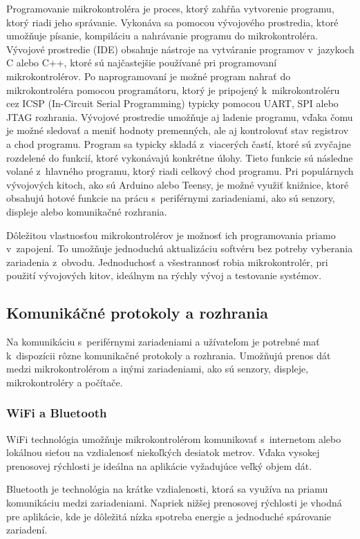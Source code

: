 Programovanie mikrokontroléra je proces, ktorý zahŕňa vytvorenie programu, ktorý riadi jeho správanie.
Vykonáva sa pomocou vývojového prostredia, ktoré umožňuje písanie, kompiláciu a nahrávanie programu do mikrokontroléra.
Vývojové prostredie (IDE) obsahuje nástroje na vytváranie programov v~jazykoch C alebo C++, ktoré sú najčastejšie používané pri programovaní mikrokontrolérov.
Po naprogramovaní je možné program nahrať do mikrokontroléra pomocou programátoru, ktorý je pripojený k~mikrokontroléru cez ICSP (In-Circuit Serial Programming) typicky pomocou UART, SPI alebo JTAG rozhrania.
Vývojové prostredie umožňuje aj ladenie programu, vďaka čomu je možné sledovať a meniť hodnoty premenných, ale aj kontrolovať stav registrov a chod programu.
Program sa typicky skladá z~viacerých častí, ktoré sú zvyčajne rozdelené do funkcií, ktoré vykonávajú konkrétne úlohy.
Tieto funkcie sú následne volané z~hlavného programu, ktorý riadi celkový chod programu.
Pri populárnych vývojových kitoch, ako sú Arduino alebo Teensy, je možné využiť knižnice, ktoré obsahujú hotové funkcie na prácu s~periférnymi zariadeniami, ako sú senzory, displeje alebo komunikačné rozhrania.

Dôležitou vlastnosťou mikrokontrolérov je možnosť ich programovania priamo v~zapojení.
To umožňuje jednoduchú aktualizáciu softvéru bez potreby vyberania zariadenia z~obvodu.
Jednoduchosť a všestrannosť robia mikrokontrolér, pri použití vývojových kitov, ideálnym na rýchly vývoj a testovanie systémov.\cite{Horowitz}

\subsection{Komunikáčné protokoly a rozhrania}
Na komunikáciu s~periférnymi zariadeniami a užívateľom je potrebné mať k~dispozícii rôzne komunikačné protokoly a rozhrania.
Umožňujú prenos dát medzi mikrokontrolérom a inými zariadeniami, ako sú senzory, displeje, mikrokontroléry a počítače.

\subsubsection{WiFi a Bluetooth}
WiFi technológia umožňuje mikrokontrolérom komunikovať s~internetom alebo lokálnou sieťou na vzdialenosť niekoľkých desiatok metrov. 
Vďaka vysokej prenosovej rýchlosti je ideálna na aplikácie vyžadujúce veľký objem dát.

Bluetooth je technológia na krátke vzdialenosti, ktorá sa využíva na priamu komunikáciu medzi zariadeniami. 
Napriek nižšej prenosovej rýchlosti je vhodná pre aplikácie, kde je dôležitá nízka spotreba energie a jednoduché spárovanie zariadení.\cite{Afaneh}

